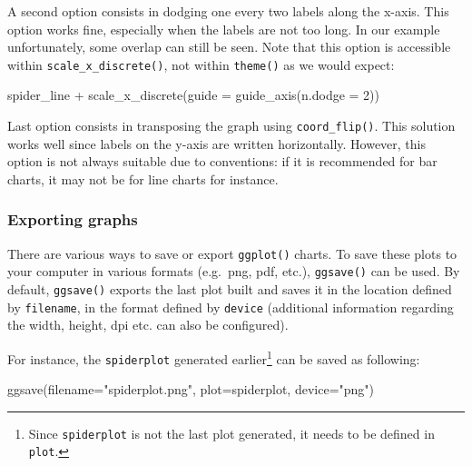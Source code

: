 \documentclass[
]{book}
\newenvironment{Shaded}{\begin{snugshade}}{\end{snugshade}}
\newcommand{\AttributeTok}[1]{\textcolor[rgb]{0.77,0.63,0.00}{#1}}
\newcommand{\DecValTok}[1]{\textcolor[rgb]{0.00,0.00,0.81}{#1}}
\newcommand{\FunctionTok}[1]{\textcolor[rgb]{0.00,0.00,0.00}{#1}}
\newcommand{\NormalTok}[1]{#1}
\newcommand{\SpecialCharTok}[1]{\textcolor[rgb]{0.00,0.00,0.00}{#1}}
\newcommand{\StringTok}[1]{\textcolor[rgb]{0.31,0.60,0.02}{#1}}
\begin{document}
A second option consists in dodging one every two labels along the x-axis. This option works fine, especially when the labels are not too long. In our example unfortunately, some overlap can still be seen. Note that this option is accessible within \texttt{scale\_x\_discrete()}, not within \texttt{theme()} as we would expect:

\begin{Shaded}
\begin{Highlighting}[]
\NormalTok{spider\_line }\SpecialCharTok{+} 
  \FunctionTok{scale\_x\_discrete}\NormalTok{(}\AttributeTok{guide =} \FunctionTok{guide\_axis}\NormalTok{(}\AttributeTok{n.dodge =} \DecValTok{2}\NormalTok{))}
\end{Highlighting}
\end{Shaded}

Last option consists in transposing the graph using \texttt{coord\_flip()}. This solution works well since labels on the y-axis are written horizontally. However, this option is not always suitable due to conventions: if it is recommended for bar charts, it may not be for line charts for instance.

\hypertarget{exporting-graphs}{%
\subsubsection{Exporting graphs}\label{exporting-graphs}}

There are various ways to save or export \texttt{ggplot()} charts. To save these plots to your computer in various formats (e.g.~png, pdf, etc.), \texttt{ggsave()} can be used. By default, \texttt{ggsave()} exports the last plot built and saves it in the location defined by \texttt{filename}, in the format defined by \texttt{device} (additional information regarding the width, height, dpi etc. can also be configured).

For instance, the \texttt{spiderplot} generated earlier\footnote{Since \texttt{spiderplot} is not the last plot generated, it needs to be defined in \texttt{plot}.} can be saved as following:

\begin{Shaded}
\begin{Highlighting}[]
\FunctionTok{ggsave}\NormalTok{(}\AttributeTok{filename=}\StringTok{"spiderplot.png"}\NormalTok{, }\AttributeTok{plot=}\NormalTok{spiderplot, }\AttributeTok{device=}\StringTok{"png"}\NormalTok{)}
\end{Highlighting}
\end{Shaded}
\end{document}
